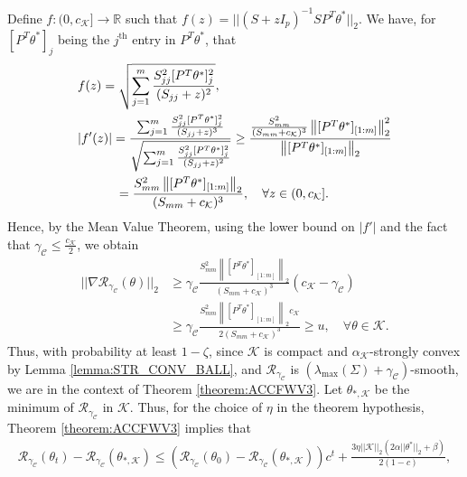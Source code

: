\documentclass{article}
\begin{document}
Define $f : (0, c_{\mathcal{K}}] \rightarrow \mathbb{R}$ such that $f(z) = ||(S + zI_p)^{-1}SP^T\theta^*||_2$. We have, for $[P^T\theta^*]_j$ being the $j^{\text{th}}$ entry in $P^T\theta^*$, that
\begin{align}
\label{eq:l=0_f'}
&f(z) = \sqrt{\sum_{j = 1}^m\frac{S_{jj}^2[P^T\theta^*]_j^2}{(S_{jj} + z)^2}}, \notag\\
&|f'(z)| = \frac{\sum_{j = 1}^m\frac{S_{jj}^2[P^T\theta^*]_j^2}{(S_{jj} + z)^3}}{\sqrt{\sum_{j = 1}^m\frac{S_{jj}^2[P^T\theta^*]_j^2}{(S_{jj} + z)^2}}} \geq \frac{\frac{S_{mm}^2}{(S_{mm} + c_{\mathcal{K}})^3}\left\|[P^T\theta^*]_{[1:m]}\right\|_2^2}{\left\|[P^T\theta^*]_{[1:m]}\right\|_2}\notag\\ 
& \qquad \quad = \frac{S_{mm}^2\left\|[P^T\theta^*]_{[1:m]}\right\|_2}{(S_{mm} + c_{\mathcal{K}})^3}, \quad \forall z \in (0, c_{\mathcal{K}}].
\end{align}
Hence, by the Mean Value Theorem, using the lower bound on $|f'|$ and the fact that $\gamma_{\mathcal{C}} \leq \frac{c_{\mathcal{K}}}{2}$, we obtain
\begin{align*}
||\nabla\mathcal{R}_{\gamma_{\mathcal{C}}}(\theta)||_2 &\geq \gamma_{\mathcal{C}}\frac{S_{mm}^2\left\|[P^T\theta^*]_{[1:m]}\right\|_2}{(S_{mm} + c_{\mathcal{K}})^3}(c_{\mathcal{K}} - \gamma_{\mathcal{C}})\\
&\geq \gamma_{\mathcal{C}}\frac{S_{mm}^2\left\|[P^T\theta^*]_{[1:m]}\right\|_2c_{\mathcal{K}}}{2(S_{mm} + c_{\mathcal{K}})^3} \geq u, \quad \forall \theta \in \mathcal{K}.
\end{align*}
Thus, with probability at least $1 - \zeta$, since $\mathcal{K}$ is compact and $\alpha_{\mathcal{K}}$-strongly convex by Lemma \ref{lemma:STR_CONV_BALL}, and $\mathcal{R}_{\gamma_{\mathcal{C}}}$ is $(\lambda_{\max}(\Sigma) + \gamma_{\mathcal{C}})$-smooth, we are in the context of Theorem \ref{theorem:ACCFWV3}. Let $\theta_{*, \mathcal{K}}$ be the minimum of $\mathcal{R}_{\gamma_{\mathcal{C}}}$ in $\mathcal{K}$. Thus, for the choice of $\eta$ in the theorem hypothesis, Theorem \ref{theorem:ACCFWV3} implies that 
\begin{align*}
\mathcal{R}_{\gamma_{\mathcal{C}}}(\theta_t) - \mathcal{R}_{\gamma_{\mathcal{C}}}(\theta_{*, \mathcal{K}}) \leq \left(\mathcal{R}_{\gamma_{\mathcal{C}}}(\theta_0) - \mathcal{R}_{\gamma_{\mathcal{C}}}(\theta_{*, \mathcal{K}})\right)c^t + \frac{3\eta ||\mathcal{K}||_2(2\alpha ||\theta^*||_2 + \beta)}{2(1 - c)},
\end{align*}
\end{document}
